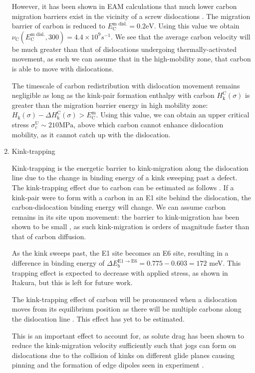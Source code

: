 \documentclass[a4paper,12pt,oneside,print,numbered,index,PageStyleIII]{PhDThesisPSnPDF}
\begin{document}
\begin{enumerate}
However, it has been shown in EAM calculations that much lower carbon migration
barriers exist in the vicinity of a screw dislocations \cite{Nematollahi2016}. The
migration barrier of carbon is reduced to \(E^{\text{m disl.}}_{\text{C}} = 0.2
    \text{eV}\). Using this value we obtain \(\nu_{\text{C}}(E^{\text{m
    disl.}}_{\text{C}}, 300) = 4.4 \times 10^{9} s^{-1}\). We see that the average carbon velocity
will be much greater than that of dislocations undergoing thermally-activated movement, as
such we can assume that in the high-mobility zone, that carbon is able to move with
dislocations.


The timescale of carbon redistribution with dislocation movement remains negligible as
long as the kink-pair formation enthalpy with carbon \(H_{\text{k}}^{\text{C}}(\sigma)\)
is greater than the migration barrier energy in high mobility zone:
\(H_{\text{k}}(\sigma) - \Delta H_{\text{k}}^{\text{C}}(\sigma) >
    E^{\text{m}}_{\text{C}}\). Using this value, we can obtain an upper critical stress
\(\sigma^{\text{U}}_c \sim 210 \text{MPa}\), above which carbon cannot enhance
dislocation mobility, as it cannot catch up with the dislocation.

\item Kink-trapping
\label{sec:org6713796}

Kink-trapping is the energetic barrier to kink-migration along the dislocation line
due to the change in binding energy of a kink sweeping past a defect. The
kink-trapping effect due to carbon can be estimated as follows
\cite{itakura13_effec_hydrog_atoms_screw_disloc}. If a
kink-pair were to form with a carbon in an E1 site behind the dislocation, the carbon-dislocation binding
energy will change. We can assume carbon remains in its
site upon movement: the barrier to kink-migration has been shown to be small
\cite{itakura13_effec_hydrog_atoms_screw_disloc,Simpson2019,Gong2020}, as such kink-migration is
orders of magnitude faster than that of carbon diffusion.

As the kink sweeps past, the E1 site becomes an E6 site, resulting in a
difference in binding energy of \(\Delta E_b^{\text{E}1\rightarrow
      \text{E}6} = 0.775 - 0.603 = 172\) meV. This trapping effect is expected to
decrease with applied stress, as shown in Itakura, but this is left for
future work.

The kink-trapping effect of carbon will be pronounced when a dislocation
moves from its equilibrium position as there will be multiple carbons along
the dislocation line \cite{Luthi2019}. This effect has yet to be estimated.

This is an important effect to account for, as solute drag has been shown to reduce
the kink-migration velocity sufficiently such that
jogs can form on dislocations due to the collision of kinks on different glide
planes causing pinning and the formation of edge dipoles seen in experiment \cite{Gong2020,Katzarov2017b}.
\end{enumerate}
\end{document}
